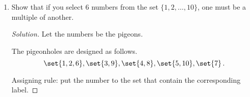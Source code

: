\documentclass[12pt]{amsart}
\begin{document}
\begin{enumerate}[label=\arabic*.,itemsep=10pt, leftmargin=*]
\begin{proof}[Solution]
    Step 2.
    Now, in $S_r$, there are $q+1$ members, which we will make to be pigeons.

    Recall each number in $S_r$ looks like
    \begin{equation*}
        kj + r\,.
    \end{equation*}
    
    In the set $S_1$ the possible $k$'s are
    \begin{equation*}
        k = 1,\dots, 2q \,.
    \end{equation*}
    
    For $S_r$ where $r=2,\dots, j-1$
    the possible $k$'s are
    \begin{equation*}
        k = 0,1, \dots, 2q-1 \,.
    \end{equation*}

    Now, we make the possible $k$'s to be the pigeons (remember, we only have $q+1$ of them but don't know which ones).

    The pigeonholes will be
    \begin{equation*}
        \set{1,2}, \set{3,4}, \dots, \set{2q - 1, 2q} 
    \end{equation*}
    if $r =1$,
    or 
    \begin{equation*}
        \set{0,1}, \set{2,3}, \dots, \set{2q - 2, 2q-1} 
    \end{equation*}
    if $r \geq 2$.
    
    In each case, there are $q$ of the pigeonholes and $q+1$ pigeons.
    By the pigeonhole principle once again, there exists a hole with two numbers that are consecutive to each other. 
    But these are the posibilities for $k$'s.
    We want to translate back to the original numbers in the set $S_r$, which will look like
    $mj + r$ and $(m+1)j + r$.
    These two numbers have the difference of $j$.
\end{proof}

\item
 Show that if you select $6$ numbers from the set $\{1,2,\dots,10\}$, one must be a multiple of another.

\begin{proof}[Solution]
    Let the numbers be the pigeons.

    The pigeonholes are designed as follows.
    \begin{equation*}
        \set{1,2,6}, \set{3,9}, \set{4,8}, \set{5,10}, \set{7}\,.
    \end{equation*}

    Assigning rule: put the number to the set that contain the corresponding label.


\end{proof}
\end{enumerate}
\end{document}
